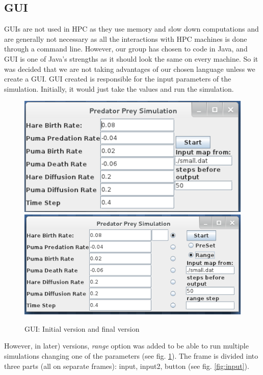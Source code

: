 \documentclass[11pt]{report}
\begin{document}
      
      	
      
      
      \subsection{GUI} %
GUIs are not used in HPC as they use memory and slow down computations and are generally not necessary as all the interactions with HPC machines is done through a command line.
However, our group has chosen to code in Java, and GUI is one of Java's strengths as it should look the same on every machine. So it was decided that we are not taking advantages of our chosen language unless we create a GUI. 
GUI created is responsible for the input parameters of the simulation. Initially, it would just take the values and run the simulation.
\begin{figure} [BeforeRange]
\begin{center}
\includegraphics[scale = 0.5]{figs/BeforeRange.png}
\includegraphics[scale = 0.47]{figs/WithRange.png}
\caption{GUI: Initial version and final version}
\label{fig:BeforeRange}
\end{center}
\end{figure}
However, in later) versions, \emph{range} option was added to be able to run multiple simulations changing one of the parameters (see fig. \ref{fig:BeforeRange}).
The frame is divided into three parts (all on separate frames): input, input2, button (see fig. \ref{fig:input}).
\end{document}
